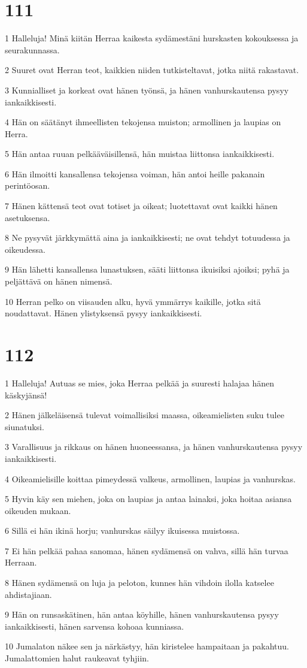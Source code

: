 \chapter{111}

\par 1 Halleluja! Minä kiitän Herraa kaikesta sydämestäni hurskasten kokouksessa ja seurakunnassa.
\par 2 Suuret ovat Herran teot, kaikkien niiden tutkisteltavat, jotka niitä rakastavat.
\par 3 Kunnialliset ja korkeat ovat hänen työnsä, ja hänen vanhurskautensa pysyy iankaikkisesti.
\par 4 Hän on säätänyt ihmeellisten tekojensa muiston; armollinen ja laupias on Herra.
\par 5 Hän antaa ruuan pelkääväisillensä, hän muistaa liittonsa iankaikkisesti.
\par 6 Hän ilmoitti kansallensa tekojensa voiman, hän antoi heille pakanain perintöosan.
\par 7 Hänen kättensä teot ovat totiset ja oikeat; luotettavat ovat kaikki hänen asetuksensa.
\par 8 Ne pysyvät järkkymättä aina ja iankaikkisesti; ne ovat tehdyt totuudessa ja oikeudessa.
\par 9 Hän lähetti kansallensa lunastuksen, sääti liittonsa ikuisiksi ajoiksi; pyhä ja peljättävä on hänen nimensä.
\par 10 Herran pelko on viisauden alku, hyvä ymmärrys kaikille, jotka sitä noudattavat. Hänen ylistyksensä pysyy iankaikkisesti.

\chapter{112}

\par 1 Halleluja! Autuas se mies, joka Herraa pelkää ja suuresti halajaa hänen käskyjänsä!
\par 2 Hänen jälkeläisensä tulevat voimallisiksi maassa, oikeamielisten suku tulee siunatuksi.
\par 3 Varallisuus ja rikkaus on hänen huoneessansa, ja hänen vanhurskautensa pysyy iankaikkisesti.
\par 4 Oikeamielisille koittaa pimeydessä valkeus, armollinen, laupias ja vanhurskas.
\par 5 Hyvin käy sen miehen, joka on laupias ja antaa lainaksi, joka hoitaa asiansa oikeuden mukaan.
\par 6 Sillä ei hän ikinä horju; vanhurskas säilyy ikuisessa muistossa.
\par 7 Ei hän pelkää pahaa sanomaa, hänen sydämensä on vahva, sillä hän turvaa Herraan.
\par 8 Hänen sydämensä on luja ja peloton, kunnes hän vihdoin ilolla katselee ahdistajiaan.
\par 9 Hän on runsaskätinen, hän antaa köyhille, hänen vanhurskautensa pysyy iankaikkisesti, hänen sarvensa kohoaa kunniassa.
\par 10 Jumalaton näkee sen ja närkästyy, hän kiristelee hampaitaan ja pakahtuu. Jumalattomien halut raukeavat tyhjiin.

